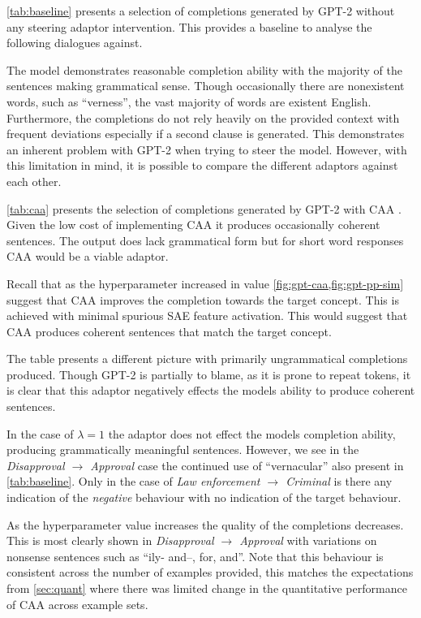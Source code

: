 

\cref{tab:baseline} presents a selection of completions generated by GPT-2 \citep{gpt-2} without any steering adaptor intervention.
This provides a baseline to analyse the following dialogues against.

The model demonstrates reasonable completion ability with the majority of the sentences making grammatical sense.
Though occasionally there are nonexistent words, such as ``verness'', the vast majority of words are existent English.
Furthermore, the completions do not rely heavily on the provided context with frequent deviations especially if a second clause is generated.
This demonstrates an inherent problem with GPT-2 when trying to steer the model.
However, with this limitation in mind, it is possible to compare the different adaptors against each other.




\cref{tab:caa} presents the selection of completions generated by GPT-2 with CAA \citep{caa}.
Given the low cost of implementing CAA it produces occasionally coherent sentences.
The output does lack grammatical form but for short word responses CAA would be a viable adaptor.

Recall that as the hyperparameter increased in value \cref{fig:gpt-caa,fig:gpt-pp-sim} suggest that CAA improves the completion towards the target concept.
This is achieved with minimal spurious SAE feature activation.
This would suggest that CAA produces coherent sentences that match the target concept.

The table presents a different picture with primarily ungrammatical completions produced.
Though GPT-2 is partially to blame, as it is prone to repeat tokens, it is clear that this adaptor negatively effects the models ability to produce coherent sentences.

In the case of $\lambda = 1$ the adaptor does not effect the models completion ability, producing grammatically meaningful sentences.
However, we see in the \emph{Disapproval $\to$ Approval} case the continued use of ``vernacular'' also present in \cref{tab:baseline}.
Only in the case of \emph{Law enforcement $\to$ Criminal} is there any indication of the \emph{negative} behaviour with no indication of the target behaviour.

As the hyperparameter value increases the quality of the completions decreases.
This is most clearly shown in \emph{Disapproval $\to$ Approval} with variations on nonsense sentences such as ``ily- and--, for, and''.
Note that this behaviour is consistent across the number of examples provided, this matches the expectations from \cref{sec:quant} where there was limited change in the quantitative performance of CAA across example sets.

